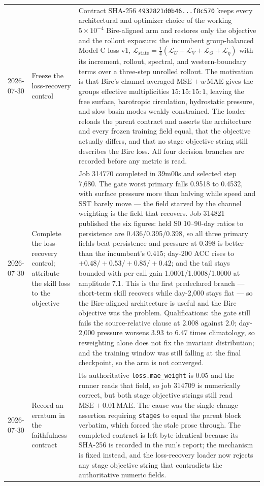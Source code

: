 \documentclass[11pt]{article}
\begin{document}
\begin{longtable}{@{}p{}p{}p{}@{}}
2026-07-30 & Freeze the loss-recovery control & Contract SHA-256 \texttt{4932821d0b46...f8c570} keeps every architectural and optimizer choice of the working \(5\times10^{-4}\) Bire-aligned arm and restores only the objective and the rollout exposure: the incumbent group-balanced Model C loss v1, \(\mathcal L_{\mathrm{state}}=\frac14(\mathcal L_U+\mathcal L_V+\mathcal L_\Theta+\mathcal L_\eta)\) with its increment, rollout, spectral, and western-boundary terms over a three-step unrolled rollout.  The motivation is that Bire's channel-averaged \(\mathrm{MSE}+w\,\mathrm{MAE}\) gives the groups effective multiplicities \(15{:}15{:}15{:}1\), leaving the free surface, barotropic circulation, hydrostatic pressure, and slow basin modes weakly constrained.  The loader reloads the parent contract and asserts the architecture and every frozen training field equal, that the objective actually differs, and that no stage objective string still describes the Bire loss.  All four decision branches are recorded before any metric is read. \\
2026-07-30 & Complete the loss-recovery control; attribute the skill loss to the objective & Job 314770 completed in 39m00s and selected step 7,680.  The gate worst primary falls 0.9518 to 0.4532, with surface pressure more than halving while speed and SST barely move --- the field starved by the channel weighting is the field that recovers.  Job 314821 published the six figures: held S0 10--90-day ratios to persistence are 0.436/0.395/0.398, so all three primary fields beat persistence and pressure at 0.398 is better than the incumbent's 0.415; day-200 ACC rises to \(+0.48/+0.53/+0.85/+0.42\); and the tail stays bounded with per-call gain 1.0001/1.0008/1.0000 at amplitude 7.1.  This is the first predeclared branch --- short-term skill recovers while day-2,000 stays flat --- so the Bire-aligned architecture is useful and the Bire objective was the problem.  Qualifications: the gate still fails the source-relative clause at 2.008 against 2.0; day-2,000 pressure worsens 3.93 to 6.47 times climatology, so reweighting alone does not fix the invariant distribution; and the training window was still falling at the final checkpoint, so the arm is not converged. \\
2026-07-30 & Record an erratum in the faithfulness contract & Its authoritative \texttt{loss.mae\_weight} is 0.05 and the runner reads that field, so job 314709 is numerically correct, but both stage objective strings still read \(\mathrm{MSE}+0.01\,\mathrm{MAE}\).  The cause was the single-change assertion requiring \texttt{stages} to equal the parent block verbatim, which forced the stale prose through.  The completed contract is left byte-identical because its SHA-256 is recorded in the run's report; the mechanism is fixed instead, and the loss-recovery loader now rejects any stage objective string that contradicts the authoritative numeric fields. \\

\end{longtable}
\end{document}
